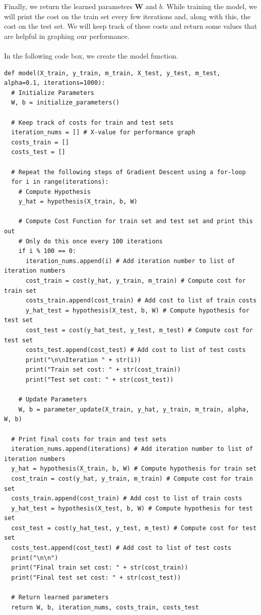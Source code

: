 \documentclass{article}
\begin{document}
Finally, we return the learned parameters $\textbf{W}$ and $b$. While training the model, we will print the cost on the train set every few iterations and, along with this, the cost on the test set. We will keep track of these costs and return some values that are helpful in graphing our performance.
\\
\\
In the following code box, we create the model function.
\begin{lstlisting}
def model(X_train, y_train, m_train, X_test, y_test, m_test, alpha=0.1, iterations=1000):
  # Initialize Parameters
  W, b = initialize_parameters()

  # Keep track of costs for train and test sets
  iteration_nums = [] # X-value for performance graph
  costs_train = []
  costs_test = []

  # Repeat the following steps of Gradient Descent using a for-loop
  for i in range(iterations):
    # Compute Hypothesis
    y_hat = hypothesis(X_train, b, W)

    # Compute Cost Function for train set and test set and print this out
    # Only do this once every 100 iterations
    if i % 100 == 0:
      iteration_nums.append(i) # Add iteration number to list of iteration numbers
      cost_train = cost(y_hat, y_train, m_train) # Compute cost for train set
      costs_train.append(cost_train) # Add cost to list of train costs
      y_hat_test = hypothesis(X_test, b, W) # Compute hypothesis for test set
      cost_test = cost(y_hat_test, y_test, m_test) # Compute cost for test set
      costs_test.append(cost_test) # Add cost to list of test costs
      print("\n\nIteration " + str(i))
      print("Train set cost: " + str(cost_train))
      print("Test set cost: " + str(cost_test))
    
    # Update Parameters
    W, b = parameter_update(X_train, y_hat, y_train, m_train, alpha, W, b)
  
  # Print final costs for train and test sets
  iteration_nums.append(iterations) # Add iteration number to list of iteration numbers
  y_hat = hypothesis(X_train, b, W) # Compute hypothesis for train set
  cost_train = cost(y_hat, y_train, m_train) # Compute cost for train set
  costs_train.append(cost_train) # Add cost to list of train costs
  y_hat_test = hypothesis(X_test, b, W) # Compute hypothesis for test set
  cost_test = cost(y_hat_test, y_test, m_test) # Compute cost for test set
  costs_test.append(cost_test) # Add cost to list of test costs
  print("\n\n")
  print("Final train set cost: " + str(cost_train))
  print("Final test set cost: " + str(cost_test))

  # Return learned parameters
  return W, b, iteration_nums, costs_train, costs_test
\end{lstlisting}
\end{document}
